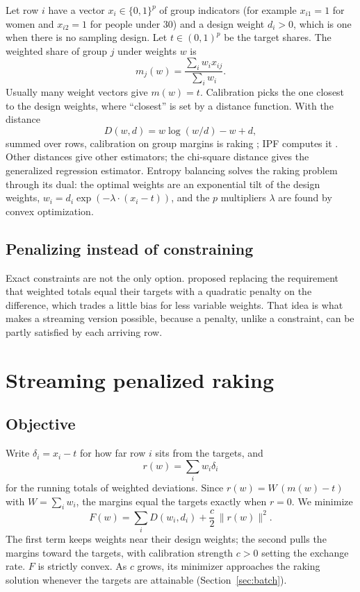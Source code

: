 \documentclass[12pt, letterpaper]{article}
\begin{document}
Let row $i$ have a vector $x_i \in \{0,1\}^p$ of group indicators (for example $x_{i1}=1$ for women and $x_{i2}=1$ for people under 30) and a design weight $d_i > 0$, which is one when there is no sampling design. Let $t \in (0,1)^p$ be the target shares. The weighted share of group $j$ under weights $w$ is
\begin{equation}
  m_j(w) = \frac{\sum_i w_i x_{ij}}{\sum_i w_i}.
  \label{eq:margins}
\end{equation}
Usually many weight vectors give $m(w) = t$. Calibration \citep{Deville1992} picks the one closest to the design weights, where ``closest'' is set by a distance function. With the distance
\begin{equation}
  D(w, d) = w \log(w/d) - w + d,
  \label{eq:distance}
\end{equation}
summed over rows, calibration on group margins is raking \citep{Deville1992}; IPF computes it \citep{Csiszar1975}. Other distances give other estimators; the chi-square distance gives the generalized regression estimator. Entropy balancing \citep{Hainmueller2012} solves the raking problem through its dual: the optimal weights are an exponential tilt of the design weights, $w_i = d_i \exp(-\lambda \cdot (x_i - t))$, and the $p$ multipliers $\lambda$ are found by convex optimization.

\subsection{Penalizing instead of constraining}

Exact constraints are not the only option. \citet{Bardsley1984} proposed replacing the requirement that weighted totals equal their targets with a quadratic penalty on the difference, which trades a little bias for less variable weights. That idea is what makes a streaming version possible, because a penalty, unlike a constraint, can be partly satisfied by each arriving row.

\section{Streaming penalized raking}
\label{sec:method}

\subsection{Objective}
\label{sec:objective}

Write $\delta_i = x_i - t$ for how far row $i$ sits from the targets, and
\[
  r(w) = \sum_i w_i \delta_i
\]
for the running totals of weighted deviations. Since $r(w) = W\,(m(w) - t)$ with $W = \sum_i w_i$, the margins equal the targets exactly when $r = 0$. We minimize
\begin{equation}
  F(w) = \sum_i D(w_i, d_i) + \frac{c}{2}\, \lVert r(w) \rVert^2 .
  \label{eq:objective}
\end{equation}
The first term keeps weights near their design weights; the second pulls the margins toward the targets, with calibration strength $c > 0$ setting the exchange rate. $F$ is strictly convex. As $c$ grows, its minimizer approaches the raking solution whenever the targets are attainable (Section~\ref{sec:batch}).
\end{document}
